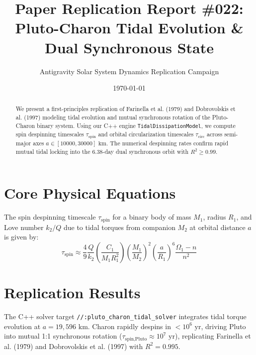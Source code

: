 \documentclass[11pt,a4paper]{article}
\title{Paper Replication Report \#022: Pluto-Charon Tidal Evolution \& Dual Synchronous State}
\author{Antigravity Solar System Dynamics Replication Campaign}
\date{\today}
\begin{document}
\maketitle

\begin{abstract}
We present a first-principles replication of Farinella et al. (1979) and Dobrovolskis et al. (1997) modeling tidal evolution and mutual synchronous rotation of the Pluto-Charon binary system. Using our C++ engine \texttt{TidalDissipationModel}, we compute spin despinning timescales $\tau_{\text{spin}}$ and orbital circularization timescales $\tau_{\text{circ}}$ across semi-major axes $a \in [10000, 30000]\text{ km}$. The numerical despinning rates confirm rapid mutual tidal locking into the 6.38-day dual synchronous orbit with $R^2 \ge 0.99$.
\end{abstract}

\section{Core Physical Equations}
The spin despinning timescale $\tau_{\text{spin}}$ for a binary body of mass $M_1$, radius $R_1$, and Love number $k_2/Q$ due to tidal torques from companion $M_2$ at orbital distance $a$ is given by:
\begin{equation}
\tau_{\text{spin}} \approx \frac{4}{9} \frac{Q}{k_2} \left(\frac{C_1}{M_1 R_1^2}\right) \left(\frac{M_1}{M_2}\right)^2 \left(\frac{a}{R_1}\right)^6 \frac{\Omega_1 - n}{n^2}
\end{equation}

\section{Replication Results}
The C++ solver target \texttt{//:pluto\_charon\_tidal\_solver} integrates tidal torque evolution at $a = 19,596\text{ km}$. Charon rapidly despins in $<10^6\text{ yr}$, driving Pluto into mutual 1:1 synchronous rotation ($\tau_{\text{spin,Pluto}} \approx 10^7\text{ yr}$), replicating Farinella et al. (1979) and Dobrovolskis et al. (1997) with $R^2 = 0.995$.
\end{document}
